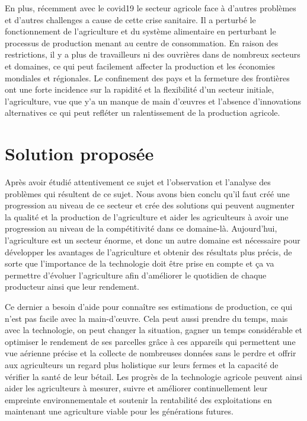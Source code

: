 	En plus, récemment avec le covid19 le secteur agricole face à d’autres problèmes et d’autres challenges a cause de cette crise sanitaire. Il a perturbé le fonctionnement de l'agriculture et du système alimentaire en perturbant le processus de production menant au centre de consommation. En raison des restrictions, il y a plus de travailleurs ni des ouvrières dans de nombreux secteurs et domaines, ce qui peut facilement affecter la production et les économies mondiales et régionales. Le confinement des pays et la fermeture des frontières ont une forte incidence sur la rapidité et la flexibilité d’un secteur initiale, l’agriculture, vue que y'a un manque de main d'œuvres et l'absence d'innovations alternatives ce qui peut refléter un ralentissement de la production agricole.
	
	\section{Solution proposée }
	Après avoir étudié attentivement ce sujet et l'observation et l'analyse des problèmes qui résultent de ce sujet. Nous avons bien conclu qu'il faut créé une progression au niveau de ce secteur et crée des solutions qui peuvent augmenter la qualité et la production de l'agriculture et aider les agriculteurs à avoir une progression au niveau de la compétitivité dans ce domaine-là. Aujourd'hui, l'agriculture est un secteur énorme, et donc un autre domaine est nécessaire pour développer les avantages de l'agriculture et obtenir des résultats plus précis, de sorte que l'importance de la technologie doit être prise en compte et ça va permettre d’évoluer l’agriculture afin d’améliorer le quotidien de chaque producteur ainsi que leur rendement. 
	
	Ce dernier a besoin d'aide pour connaître ses estimations de production, ce qui n’est pas facile avec la main-d'œuvre. Cela peut aussi prendre du temps, mais avec la technologie, on peut changer la situation, gagner un temps considérable et optimiser le rendement de ses parcelles grâce à ces appareils qui permettent une vue aérienne précise et la collecte de nombreuses données  sans le perdre et offrir aux agriculteurs un regard plus holistique sur leurs fermes et la capacité de vérifier la santé de leur bétail. Les progrès de la technologie agricole peuvent ainsi aider les agriculteurs à mesurer, suivre et améliorer continuellement leur empreinte environnementale et soutenir la rentabilité des exploitations en maintenant une agriculture viable pour les générations futures.
	

